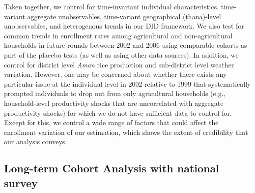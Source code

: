 \documentclass[12pt,letterpaper]{article}\usepackage[margin=1in]{geometry}
\newcommand{\0}{\ensuremath{\mbox{\boldmath $0$}}}
\begin{document}
Taken together, we control for time-invariant individual characteristics, time-variant aggregate unobservables, time-variant geographical (thana)-level unobservables, and heterogenous trends in our DID framework. We also test for common trends in enrollment rates among agricultural and non-agricultural households in future rounds between 2002 and 2006 using comparable cohorts as part of the placebo tests (as well as using other data sources). In addition, we control for district level \textit{Aman} rice production and sub-district level weather variation. However, one may be concerned about whether there exists any particular issue at the individual level in 2002 relative to 1999 that systematically prompted individuals to drop out from only agricultural households (e.g., household-level productivity shocks that are uncorrelated with aggregate productivity shocks) for which we do not have sufficient data to control for. Except for this, we control a wide range of factors that could affect the enrollment variation of our estimation, which shows the extent of credibility that our analysis conveys.

\subsection{Long-term Cohort Analysis with national survey}
\end{document}
